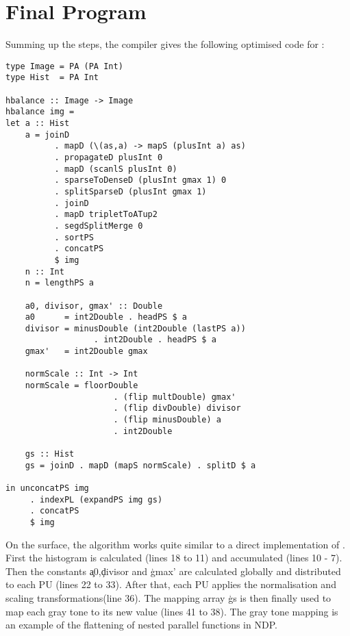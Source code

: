 \section{Final Program}
  Summing up the steps, the compiler gives the following optimised code for \ndpv:
  \begin{lstlisting}
type Image = PA (PA Int)
type Hist  = PA Int

hbalance :: Image -> Image
hbalance img =
let a :: Hist
    a = joinD
          . mapD (\(as,a) -> mapS (plusInt a) as)
          . propagateD plusInt 0
          . mapD (scanlS plusInt 0)
          . sparseToDenseD (plusInt gmax 1) 0
          . splitSparseD (plusInt gmax 1)
          . joinD
          . mapD tripletToATup2
          . segdSplitMerge 0
          . sortPS
          . concatPS
          $ img
    n :: Int
    n = lengthPS a
    
    a0, divisor, gmax' :: Double
    a0      = int2Double . headPS $ a
    divisor = minusDouble (int2Double (lastPS a))
                  . int2Double . headPS $ a
    gmax'   = int2Double gmax
    
    normScale :: Int -> Int
    normScale = floorDouble
                      . (flip multDouble) gmax'
                      . (flip divDouble) divisor
                      . (flip minusDouble) a
                      . int2Double
      
    gs :: Hist
    gs = joinD . mapD (mapS normScale) . splitD $ a
    
in unconcatPS img
     . indexPL (expandPS img gs)
     . concatPS
     $ img
  \end{lstlisting} %
  On the surface, the algorithm works quite similar to a direct implementation of \ndpn.
  First the histogram is calculated (lines 18 to 11) and accumulated (lines 10 - 7).
  Then the constants \c{a0},\c{divisor} and \c{gmax'} are calculated globally and distributed
  to each PU (lines 22 to 33). After that, each PU applies the normalisation and scaling transformations(line 36).
  The mapping array \c{gs} is then finally used to map each gray tone to its new value (lines 41 to 38).
  The gray tone mapping is an example of the flattening of nested parallel functions in NDP.
  
